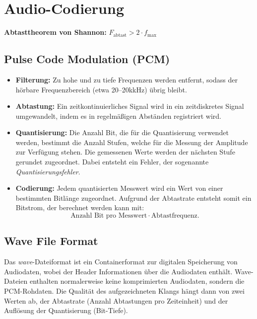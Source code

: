 \section{Audio-Codierung}\label{sec:audio-codierung}

\begin{definition}{}
    \textbf{Abtasttheorem von Shannon:} $F_{\text{abtast}} > 2 \cdot f_{\max}$
\end{definition}

\subsection{Pulse Code Modulation (PCM)}\label{subsec:pulse-code-modulation}
\begin{itemize}
    \item \textbf{Filterung:} Zu hohe und zu tiefe Frequenzen werden entfernt, sodass der hörbare Frequenzbereich (etwa 20--20kkHz) übrig bleibt.
    \item \textbf{Abtastung:} Ein zeitkontinuierliches Signal wird in ein zeitdiskretes Signal umgewandelt, indem es in regelmäßigen Abständen registriert wird.
    \item \textbf{Quantisierung:} Die Anzahl Bit, die für die Quantisierung verwendet werden, bestimmt die Anzahl Stufen, welche für die Messung der Amplitude zur Verfügung stehen.
    Die gemessenen Werte werden der nächsten Stufe gerundet zugeordnet.
    Dabei entsteht ein Fehler, der sogenannte \emph{Quantisierungsfehler}.
    \item \textbf{Codierung:} Jedem quantisierten Messwert wird ein Wert von einer bestimmten Bitlänge zugeordnet.
    Aufgrund der Abtastrate entsteht somit ein Bitstrom, der berechnet werden kann mit: \[\text{Anzahl Bit pro Messwert} \cdot \text{Abtastfrequenz}.\]
\end{itemize}

\subsection{Wave File Format}\label{subsec:wave-file-format}

Das \emph{wave}-Dateiformat ist ein Containerformat zur digitalen Speicherung von Audiodaten, wobei der Header Informationen über die Audiodaten enthält.
Wave-Dateien enthalten normalerweise keine komprimierten Audiodaten, sondern die PCM-Rohdaten.
Die Qualität des aufgezeichneten Klangs hängt dann von zwei Werten ab, der Abtastrate (Anzahl Abtastungen pro Zeiteinheit) und der Auflösung der Quantisierung (Bit-Tiefe).

